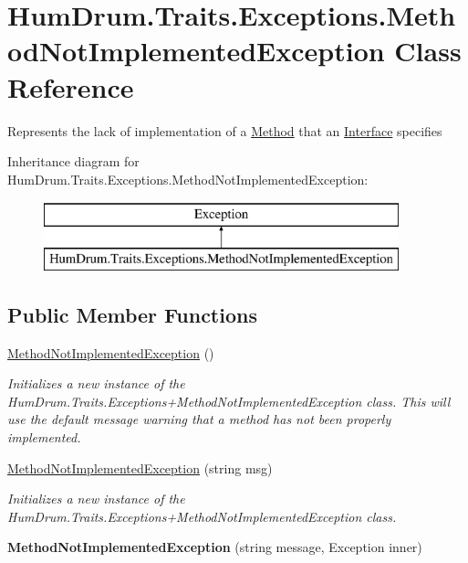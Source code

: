 \hypertarget{classHumDrum_1_1Traits_1_1Exceptions_1_1MethodNotImplementedException}{}\section{Hum\+Drum.\+Traits.\+Exceptions.\+Method\+Not\+Implemented\+Exception Class Reference}
\label{classHumDrum_1_1Traits_1_1Exceptions_1_1MethodNotImplementedException}


Represents the lack of implementation of a \hyperlink{classHumDrum_1_1Traits_1_1Method}{Method} that an \hyperlink{classHumDrum_1_1Traits_1_1Interface}{Interface} specifies  


Inheritance diagram for Hum\+Drum.\+Traits.\+Exceptions.\+Method\+Not\+Implemented\+Exception\+:\begin{figure}[H]
\begin{center}
\leavevmode
\includegraphics[height=2.000000cm]{classHumDrum_1_1Traits_1_1Exceptions_1_1MethodNotImplementedException}
\end{center}
\end{figure}
\subsection*{Public Member Functions}
\begin{DoxyCompactItemize}
\item 
\hyperlink{classHumDrum_1_1Traits_1_1Exceptions_1_1MethodNotImplementedException_a765e8aec8d09d894ee44f0d51ca626e4}{Method\+Not\+Implemented\+Exception} ()
\begin{DoxyCompactList}\small\item\em Initializes a new instance of the Hum\+Drum.\+Traits.\+Exceptions+\+Method\+Not\+Implemented\+Exception class. This will use the default message warning that a method has not been properly implemented. \end{DoxyCompactList}\item 
\hyperlink{classHumDrum_1_1Traits_1_1Exceptions_1_1MethodNotImplementedException_ad1356dbd030eda6d682496bd31d46b20}{Method\+Not\+Implemented\+Exception} (string msg)
\begin{DoxyCompactList}\small\item\em Initializes a new instance of the Hum\+Drum.\+Traits.\+Exceptions+\+Method\+Not\+Implemented\+Exception class. \end{DoxyCompactList}\item 
\hypertarget{classHumDrum_1_1Traits_1_1Exceptions_1_1MethodNotImplementedException_aadb01403cca52e9da7efacb3ff0b107c}{}{\bfseries Method\+Not\+Implemented\+Exception} (string message, Exception inner)\label{classHumDrum_1_1Traits_1_1Exceptions_1_1MethodNotImplementedException_aadb01403cca52e9da7efacb3ff0b107c}

\end{DoxyCompactItemize}


